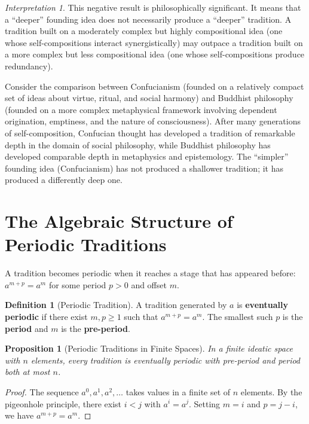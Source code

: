 \documentclass[11pt,openany]{book}
\theoremstyle{definition}
\newtheorem{definition}[axiom]{Definition}
\theoremstyle{plain}
\newtheorem{proposition}[axiom]{Proposition}
\theoremstyle{remark}
\newtheorem{interpretation}[axiom]{Interpretation}
\begin{document}
\begin{interpretation}
This negative result is philosophically significant. It means that a ``deeper'' founding idea does not necessarily produce a ``deeper'' tradition. A tradition built on a moderately complex but highly compositional idea (one whose self-compositions interact synergistically) may outpace a tradition built on a more complex but less compositional idea (one whose self-compositions produce redundancy).

Consider the comparison between Confucianism (founded on a relatively compact set of ideas about virtue, ritual, and social harmony) and Buddhist philosophy (founded on a more complex metaphysical framework involving dependent origination, emptiness, and the nature of consciousness). After many generations of self-composition, Confucian thought has developed a tradition of remarkable depth in the domain of social philosophy, while Buddhist philosophy has developed comparable depth in metaphysics and epistemology. The ``simpler'' founding idea (Confucianism) has not produced a shallower tradition; it has produced a differently deep one.
\end{interpretation}

\section{The Algebraic Structure of Periodic Traditions}

A tradition becomes periodic when it reaches a stage that has appeared before: $a^{m+p} = a^m$ for some period $p > 0$ and offset $m$.

\begin{definition}[Periodic Tradition]
A tradition generated by $a$ is \textbf{eventually periodic} if there exist $m, p \geq 1$ such that $a^{m+p} = a^m$. The smallest such $p$ is the \textbf{period} and $m$ is the \textbf{pre-period}.
\end{definition}

\begin{proposition}[Periodic Traditions in Finite Spaces]
In a finite ideatic space with $n$ elements, every tradition is eventually periodic with pre-period and period both at most $n$.
\end{proposition}

\begin{proof}
The sequence $a^0, a^1, a^2, \ldots$ takes values in a finite set of $n$ elements. By the pigeonhole principle, there exist $i < j$ with $a^i = a^j$. Setting $m = i$ and $p = j - i$, we have $a^{m+p} = a^m$.
\end{proof}
\end{document}

